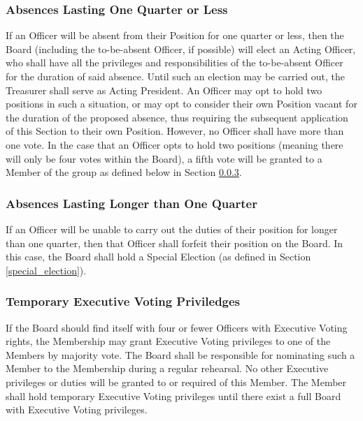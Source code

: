\documentclass{article}
\begin{document}
\subsubsection{Absences Lasting One Quarter or Less}
If an Officer will be absent from their Position for one quarter or less, then
the Board (including the to-be-absent Officer, if possible) will elect an Acting
Officer, who shall have all the privileges and responsibilities of the
to-be-absent Officer for the duration of said absence. Until such an election
may be carried out, the Treasurer shall serve as Acting President. An Officer
may opt to hold two positions in such a situation, or may opt to consider their
own Position vacant for the duration of the proposed absence, thus requiring the
subsequent application of this Section to their own Position. However, no
Officer shall have more than one vote. In the case that an Officer opts to hold
two positions (meaning there will only be four votes within the Board), a fifth
vote will be granted to a Member of the group as defined below in Section
\ref{temporary_voting}.

\subsubsection{Absences Lasting Longer than One Quarter} \label{long_absence}
If an Officer will be unable to carry out the duties of their position for
longer than one quarter, then that Officer shall forfeit their position on the
Board. In this case, the Board shall hold a Special Election (as defined in
Section \ref{special_election}).

\subsubsection{Temporary Executive Voting Priviledges} \label{temporary_voting}

If the Board should find itself with four or fewer Officers with Executive
Voting rights, the Membership may grant Executive Voting privileges to one of
the Members by majority vote. The Board shall be responsible for nominating such
a Member to the Membership during a regular rehearsal. No other Executive
privileges or duties will be granted to or required of this Member. The Member
shall hold temporary Executive Voting privileges until there exist a full Board
with Executive Voting privileges.

\end{document}
